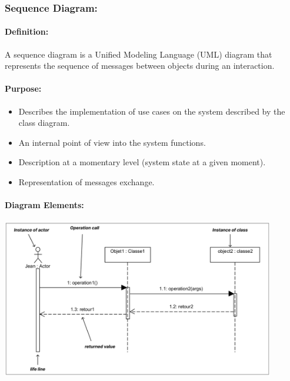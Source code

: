 \documentclass{article}
\begin{document}
\newpage
\subsubsection*{Sequence Diagram:}

\paragraph*{\textbf{Definition:} }

A sequence diagram is a Unified Modeling Language (UML) diagram that represents the sequence of messages between objects during an interaction.


\paragraph*{\textbf{Purpose: }}
\begin{itemize}
    \item Describes the implementation of use cases on the system described by the class diagram.
    \item An internal point of view into the system functions.
    \item Description at a momentary level (system state at a given moment).
    \item Representation of messages exchange.
\end{itemize}

\paragraph*{\textbf{Diagram Elements: }}
\vspace{0.3cm}
\begin{center}
    \includegraphics[width=451px]{media/sequence_elements.png}
\end{center}
\end{document}
